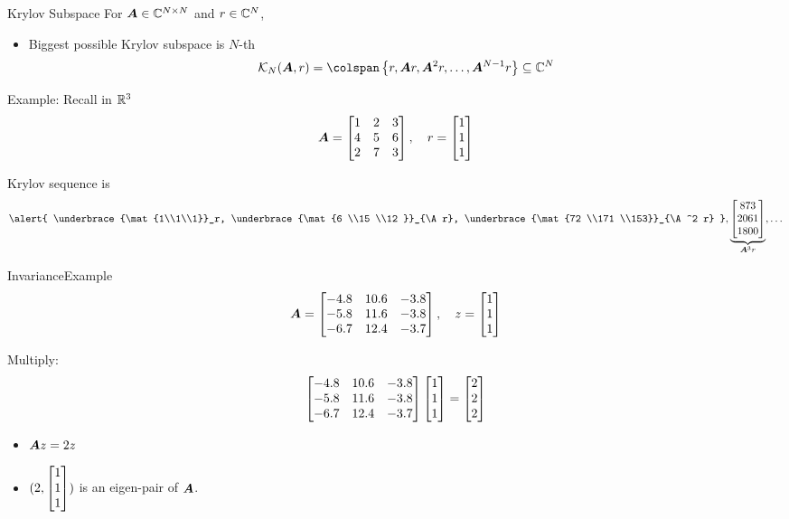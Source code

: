 \documentclass{beamer}
\begin{document}
\begin{frame}{Krylov Subspace}%
For $\bm{A}\in\mathbb{C}^{N\times N}$ and $r\in\mathbb{C}^N$, 
\begin{itemize}
\item Biggest possible Krylov subspace is $N$-th 
\[
\krylov{N}{\A}{r} =  \colspan\left\{r,\A r,\A^2 r,\ldots,\A^{N-1}r \right\} \subseteq \C^N
\]
\end{itemize}

Example:  Recall in $\mathbb{R}^3$
\[
\bm{A} = \begin{bmatrix} 1& 2& 3\\4& 5& 6\\ 2 &7 &3\end{bmatrix}, \quad  r = \begin{bmatrix} 1\\1\\1\end{bmatrix}
\]

Krylov sequence is 
\[ 
\alert{
	\underbrace{\mat{1\\1\\1}}_r, \underbrace{\mat{6 \\15 \\12 }}_{\A r}, 
	\underbrace{\mat{72 \\171 \\153}}_{\A^2 r} },
	\underbrace{\mat{873 \\2061 \\1800}}_{\A^3 r}  ,
\ldots
\]
\end{frame}


\begin{frame}{Invariance}{Example}%
\[ 
  \bm{A} = \begin{bmatrix} 
   -4.8 & 10.6 & -3.8 \\
   -5.8 & 11.6 & -3.8 \\
   -6.7 & 12.4 & -3.7 \end{bmatrix}, \quad z = \begin{bmatrix} 1\\1\\1\end{bmatrix}
\]

Multiply:
\[
\begin{bmatrix} 
   -4.8 & 10.6 & -3.8 \\
   -5.8 & 11.6 & -3.8 \\
   -6.7 & 12.4 & -3.7 \end{bmatrix} 
 \begin{bmatrix} 1\\1\\1\end{bmatrix} = \begin{bmatrix} 2\\2\\2\end{bmatrix}
\]


\begin{itemize}
\item $\bm{A} z = 2z$

\item $( 2, \begin{bmatrix} 1\\1\\1\end{bmatrix})$ is an eigen-pair of $\bm{A}$. 
\end{itemize}
\end{frame}
\end{document}
